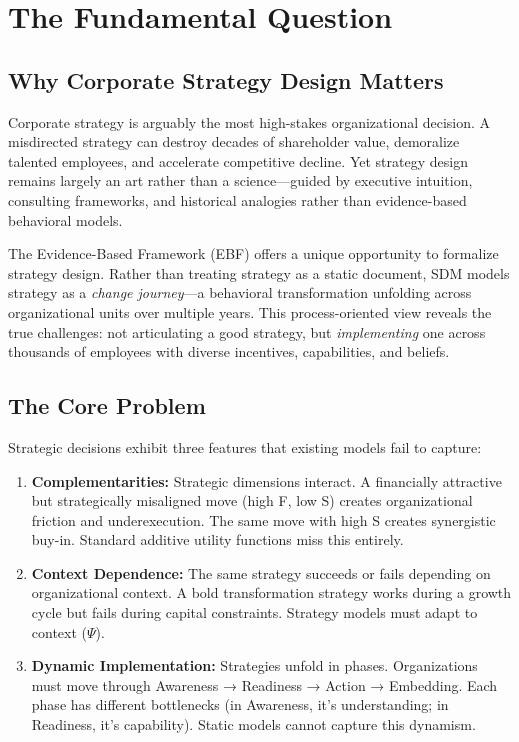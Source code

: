\section{The Fundamental Question}
\label{sec:sdm-fundamental}

\subsection{Why Corporate Strategy Design Matters}

Corporate strategy is arguably the most high-stakes organizational decision. A misdirected strategy can destroy decades of shareholder value, demoralize talented employees, and accelerate competitive decline. Yet strategy design remains largely an art rather than a science---guided by executive intuition, consulting frameworks, and historical analogies rather than evidence-based behavioral models.

The Evidence-Based Framework (EBF) offers a unique opportunity to formalize strategy design. Rather than treating strategy as a static document, SDM models strategy as a \textit{change journey}---a behavioral transformation unfolding across organizational units over multiple years. This process-oriented view reveals the true challenges: not articulating a good strategy, but \textit{implementing} one across thousands of employees with diverse incentives, capabilities, and beliefs.

\subsection{The Core Problem}

Strategic decisions exhibit three features that existing models fail to capture:

\begin{enumerate}
    \item \textbf{Complementarities:} Strategic dimensions interact. A financially attractive but strategically misaligned move (high F, low S) creates organizational friction and underexecution. The same move with high S creates synergistic buy-in. Standard additive utility functions miss this entirely.

    \item \textbf{Context Dependence:} The same strategy succeeds or fails depending on organizational context. A bold transformation strategy works during a growth cycle but fails during capital constraints. Strategy models must adapt to context ($\Psi$).

    \item \textbf{Dynamic Implementation:} Strategies unfold in phases. Organizations must move through Awareness → Readiness → Action → Embedding. Each phase has different bottlenecks (in Awareness, it's understanding; in Readiness, it's capability). Static models cannot capture this dynamism.
\end{enumerate}

